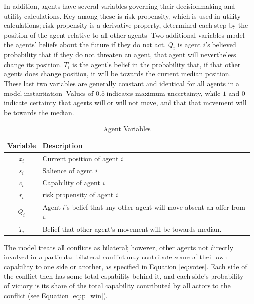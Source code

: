In addition, agents have several variables governing their decisionmaking and utility calculations. Key among these is risk propensity, which is used in utility calculations; risk propensity is a derivative property, determined each step by the position of the agent relative to all other agents. Two additional variables model the agents' beliefs about the future if they do not act. $Q_i$ is agent $i$'s believed probability that if they do not threaten an agent, that agent will nevertheless change its position. $T_i$ is the agent's belief in the probability that, if that other agents does change position, it will be towards the current median position. These last two variables are generally constant and identical for all agents in a model instantiation. Values of $0.5$ indicates maximum uncertainty, while $1$ and $0$ indicate certainty that agents will or will not move, and that that movement will be towards the median.

\begin{table}
\centering
\caption{Agent Variables}
\label{table:model_vars}
\begin{tabular}{cl}
    \hline
    Variable &  Description \\
    \hline
    $x_i$       &        Current position of agent $i$  \\
    $s_i$       &        Salience of agent $i$          \\
    $c_i$       &        Capability of agent $i$        \\
    \hline
    $r_i$       &        risk propensity of agent $i$  \\
    $Q_i$       &   Agent $i$'s belief that any other agent will move absent an offer from $i$. \\
    $T_i$       & Belief that other agent's movement will be towards median. \\
    \hline
\end{tabular}
\tableSpace
\end{table}


The model treats all conflicts as bilateral; however, other agents not directly involved in a particular bilateral conflict may contribute some of their own capability to one side or another, as specified in Equation \ref{eq:votes}. Each side of the conflict then has some total capability behind it, and each side's probability of victory is its share of the total capability contributed by all actors to the conflict (see Equation \ref{eq:p_win}). 

